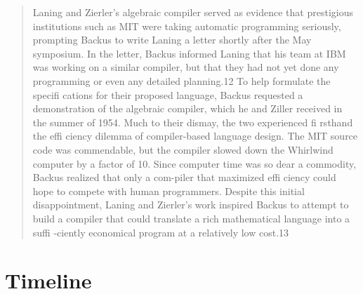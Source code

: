 \begin{quotation}
Laning and Zierler's algebraic compiler served as evidence that prestigious 
institutions such as MIT were taking automatic programming seriously, prompting 
Backus to write Laning a letter shortly after the May symposium. In the letter, 
Backus informed Laning that his team at IBM was working on a similar compiler, 
but that they had not yet done any programming or even any detailed planning.12 
To help formulate the specifi cations for their proposed language, Backus 
requested a demonstration of the algebraic compiler, which he and Ziller 
received in the summer of 1954. Much to their dismay, the two experienced fi 
rsthand the effi ciency dilemma of compiler-based language design. The MIT 
source code was commendable, but the compiler slowed down the Whirlwind 
computer by a factor of 10. Since computer time was so dear a commodity, Backus 
realized that only a com-piler that maximized effi ciency could hope to compete 
with human programmers. Despite this initial disappointment, Laning and 
Zierler's work inspired Backus to attempt to build a compiler that could 
translate a rich mathematical language into a suffi -ciently economical program 
at a relatively low cost.13
\cite{grace_hopper_and_the_invention_of_the_information_age_2009}
\end{quotation}

\pagebreak
\section{Timeline}

